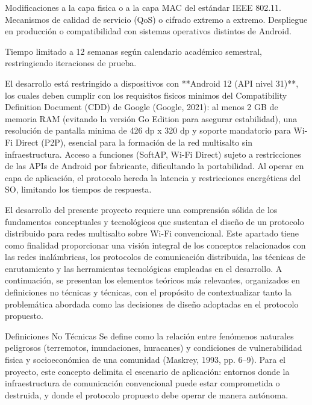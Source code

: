 Modificaciones a la capa fisica o a la capa MAC del estándar IEEE 802.11. Mecanismos de calidad de servicio (QoS) o cifrado extremo a extremo. Despliegue en producción o compatibilidad con sistemas operativos distintos de Android.


Tiempo limitado a 12 semanas según calendario académico semestral, restringiendo iteraciones de prueba.

El desarrollo está restringido a dispositivos con **Android 12 (API nivel 31)**, los cuales deben cumplir con los requisitos fisicos minimos del Compatibility Definition Document (CDD) de Google (Google, 2021): al menos 2 GB de memoria RAM (evitando la versión Go Edition para asegurar estabilidad), una resolución de pantalla minima de 426 dp x 320 dp y soporte mandatorio para Wi-Fi Direct (P2P), esencial para la formación de la red multisalto sin infraestructura. Acceso a funciones (SoftAP, Wi-Fi Direct) sujeto a restricciones de las APIs de Android por fabricante, dificultando la portabilidad. Al operar en capa de aplicación, el protocolo hereda la latencia y restricciones energéticas del SO, limitando los tiempos de respuesta.

\newpage
{}


El desarrollo del presente proyecto requiere una comprensión sólida de los fundamentos conceptuales y tecnológicos que sustentan el diseño de un protocolo distribuido para redes multisalto sobre Wi-Fi convencional. Este apartado tiene como finalidad proporcionar una visión integral de los conceptos relacionados con las redes inalámbricas, los protocolos de comunicación distribuida, las técnicas de enrutamiento y las herramientas tecnológicas empleadas en el desarrollo. A continuación, se presentan los elementos teóricos más relevantes, organizados en definiciones no técnicas y técnicas, con el propósito de contextualizar tanto la problemática abordada como las decisiones de diseño adoptadas en el protocolo propuesto.

Definiciones No Técnicas Se define como la relación entre fenómenos naturales peligrosos (terremotos, inundaciones, huracanes) y condiciones de vulnerabilidad fisica y socioeconómica de una comunidad (Maskrey, 1993, pp. 6--9). Para el proyecto, este concepto delimita el escenario de aplicación: entornos donde la infraestructura de comunicación convencional puede estar comprometida o destruida, y donde el protocolo propuesto debe operar de manera autónoma.

